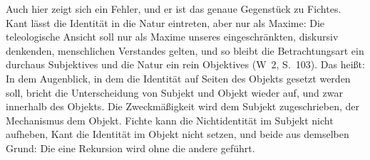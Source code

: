 \documentclass[11pt,a4paper]{article}
\newcommand{\Werke}[1]{(W~2, S.~#1)}
\begin{document}
Auch hier zeigt sich ein Fehler, und er ist das genaue Gegenstück zu Fichtes. Kant lässt die Identität in die Natur eintreten, aber nur als Maxime: Die teleologische Ansicht \glqq soll nur als Maxime unseres eingeschränkten, diskursiv denkenden, menschlichen Verstandes gelten\grqq{}, und so bleibt \glqq die Betrachtungsart ein durchaus Subjektives und die Natur ein rein Objektives\grqq{} \Werke{103}. Das heißt: In dem Augenblick, in dem die Identität auf Seiten des Objekts gesetzt werden soll, bricht die Unterscheidung von Subjekt und Objekt wieder auf, und zwar innerhalb des Objekts. Die Zweckmäßigkeit wird dem Subjekt zugeschrieben, der Mechanismus dem Objekt. Fichte kann die Nichtidentität im Subjekt nicht aufheben, Kant die Identität im Objekt nicht setzen, und beide aus demselben Grund: Die eine Rekursion wird ohne die andere geführt.
\end{document}
